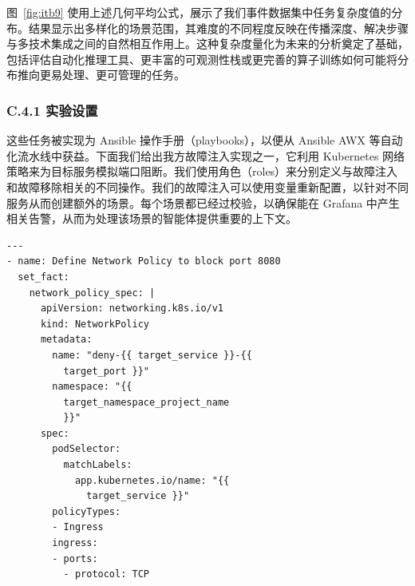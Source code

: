 图~\ref{fig:itb9} 使用上述几何平均公式，展示了我们事件数据集中任务复杂度值的分布。结果显示出多样化的场景范围，其难度的不同程度反映在传播深度、解决步骤与多技术集成之间的自然相互作用上。这种复杂度量化为未来的分析奠定了基础，包括评估自动化推理工具、更丰富的可观测性栈或更完善的算子训练如何可能将分布推向更易处理、更可管理的任务。

\subsubsection{C.4.1 实验设置}

这些任务被实现为 Ansible 操作手册（playbooks），以便从 Ansible AWX 等自动化流水线中获益。下面我们给出我方故障注入实现之一，它利用 Kubernetes 网络策略来为目标服务模拟端口阻断。我们使用角色（roles）来分别定义与故障注入和故障移除相关的不同操作。我们的故障注入可以使用变量重新配置，以针对不同服务从而创建额外的场景。每个场景都已经过校验，以确保能在 Grafana 中产生相关告警，从而为处理该场景的智能体提供重要的上下文。

\begin{verbatim}
---
- name: Define Network Policy to block port 8080
  set_fact:
    network_policy_spec: |
      apiVersion: networking.k8s.io/v1
      kind: NetworkPolicy
      metadata:
        name: "deny-{{ target_service }}-{{
          target_port }}"
        namespace: "{{
          target_namespace_project_name
          }}"
      spec:
        podSelector:
          matchLabels:
            app.kubernetes.io/name: "{{
              target_service }}"
        policyTypes:
        - Ingress
        ingress:
        - ports:
          - protocol: TCP
\end{verbatim}
